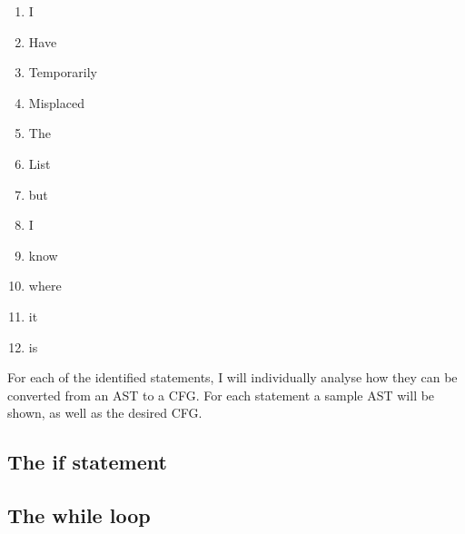 \begin{enumerate}[nolistsep]
\item I
\item Have
\item Temporarily
\item Misplaced
\item The
\item List
\item but
\item I
\item know
\item where
\item it
\item is
\end{enumerate}

For each of the identified statements, I will individually analyse how they can be converted from an AST to a CFG. For each statement a sample AST will be shown, as well as the desired CFG.

\subsection{The if statement}

\subsection{The while loop}

